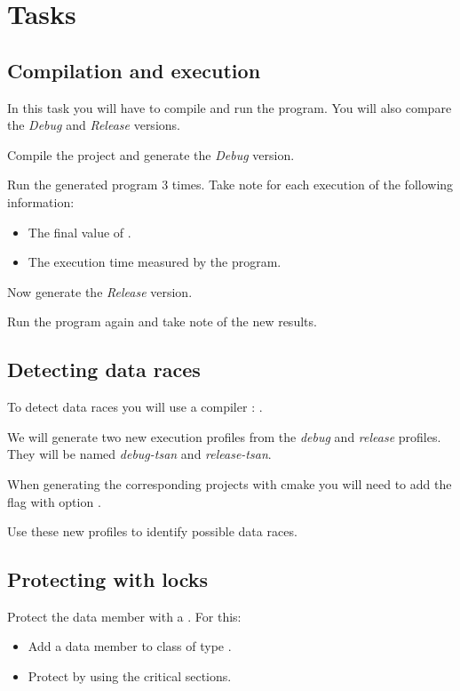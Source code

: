 \section{Tasks}

\subsection{Compilation and execution}

In this task you will have to compile and run the program.
You will also compare the \emph{Debug} and \emph{Release} versions.

Compile the project and generate the \emph{Debug} version.

Run the generated program 3 times.
Take note for each execution of the following information:
\begin{itemize}
\item The final value of .
\item The execution time measured by the program.
\end{itemize}

Now generate the \emph{Release} version.

Run the program again and take note of the new results.

\subsection{Detecting data races}

To detect data races you will use a compiler : 
.

We will generate two new execution profiles from the \emph{debug} and \emph{release} profiles.
They will be named \emph{debug-tsan} and \emph{release-tsan}.

When generating the corresponding projects with cmake you will need to add the flag
 with option
.

Use these new profiles to identify possible data races.

\subsection{Protecting with locks}

Protect the  data member with a . For this:

\begin{itemize}
  \item Add a data member to class  of type .
  \item Protect by using  the critical sections.
\end{itemize}

